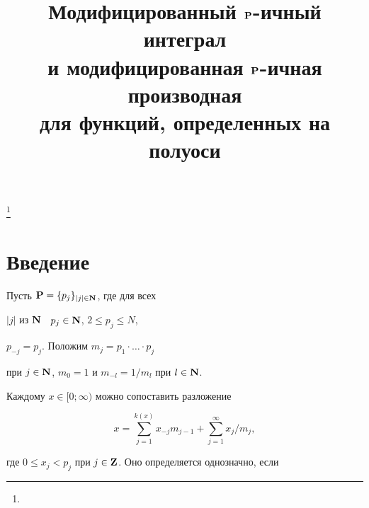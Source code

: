 

\title{Модифицированный ${\bold P}$-ичный интеграл\\


и модифицированная ${\bold P}$-ичная производная\\


для функций, определенных на полуоси}


\thanks{}





\date{}




\pagestyle{plain} %







\maketitle


\label{begin}











\section*{Введение}





Пусть ${\bold P}=\{p_j\}_{|j|\in {\bold N}}$, где для всех


$|j|$ из ${\bold N}$ \ $p_j\in {\bold N}$, $2\leq p_j\leq N$,


$p_{-j}=p_j$. Положим $m_j=p_1\cdot\dotsc\cdot p_j$


при $j\in {\bold N}$, $m_0=1$ и $m_{-l}=1/m_l$ при $l\in{\bold N}$. 


Каждому $x\in [0;\infty)$ можно сопоставить разложение


\begin{equation}


x=\sum^{k(x)}_{j=1}x_{-j}m_{j-1} + \sum^{\infty}_{j=1}x_j/m_j,


\end{equation}


где $0\leq x_j < p_j$ при $j\in {\bold Z}$. Оно определяется однозначно, если 


